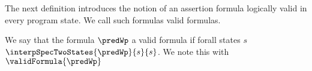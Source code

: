  

The next definition introduces the notion of an assertion formula logically valid 
in every program state. We call such formulas  valid formulas. 

\begin{interpretation}\label{assertLang:interpretation:valid}
  We say that the formula  $ \predWp $ a valid formula if forall states $s$  $\interpSpecTwoStates{\predWp}{s}{s}$. 
We note this with  $\validFormula{\predWp}$ 
\end{interpretation}
